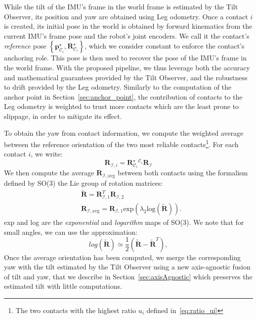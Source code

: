 \documentclass{IJCAS}
\begin{document}
While the tilt of the IMU's frame in the world frame is estimated by the Tilt Observer, its position and yaw are obtained using Leg odometry. Once a contact $i$ is created, its initial pose in the world is obtained by forward kinematics from the current IMU's frame pose and the robot's joint encoders. We call it the contact's \emph{reference} pose $\left\{ \boldsymbol{p}^{\star}_{\mathcal{C}_{i}}, \boldsymbol{R}^{\star}_{\mathcal{C}_{i}}\right\}$, which we consider constant to enforce the contact's anchoring role. This pose is then used to recover the pose of the IMU's frame in the world frame. 
With the proposed pipeline, we thus leverage both the accuracy and mathematical guarantees provided by the Tilt Observer, and the robustness to drift provided by the Leg odometry. Similarly to the computation of the anchor point in Section~\ref{sec:anchor_point}, the contribution of contacts to the Leg odometry is weighted to trust more contacts which are the least prone to slippage, in order to mitigate its effect.


To obtain the yaw from contact information, we compute the weighted average between the reference orientation of the two most reliable contacts\footnote{The two contacts with the highest ratio $u_{i}$ defined in~\eqref{eq:ratio_ui}}. For each contact $i$, we write:
\begin{equation}
    \boldsymbol{R}_{\mathcal{I}, i} = \boldsymbol{R}^{\star}_{\mathcal{C}_{i}} {}^{\mathcal{C}_{i}} \boldsymbol{R}_{\mathcal{I}} 
\end{equation}
We then compute the average $\boldsymbol{R}_{\mathcal{I}, \text{avg}}$ between both contacts using the formalism defined by SO(3) the Lie group of rotation matrices:
\begin{align}
    &\tilde{\boldsymbol{R}} = \boldsymbol{R}^{T}_{\mathcal{I}, 1} \boldsymbol{R}_{\mathcal{I}, 2}  \\
 & \boldsymbol{R}_{\mathcal{I}, \text{avg}} = \boldsymbol{R}_{\mathcal{I}, 1} \text{exp} \left( \lambda_{2}\text{log} \left( \tilde{\boldsymbol{R}}\right)  \right). \label{eq:leg_odom_avg_ori}
\end{align}
exp and log are the \emph{exponential} and \emph{logarithm} maps of SO(3). We note that for small angles, we can use the approximation:
\begin{equation}
log\left(\tilde{\boldsymbol{R}}\right) \simeq \frac{1}{2} \left(\tilde{\boldsymbol{R}}-\tilde{\boldsymbol{R}}^{T}\right), \label{eq:log_small}
\end{equation}
Once the average orientation has been computed, we merge the corresponding yaw with the tilt estimated by the Tilt Observer using a new axis-agnostic fusion of tilt and yaw, that we describe in Section~\ref{sec:axisAgnostic} which preserves the estimated tilt with little computations.
\end{document}
